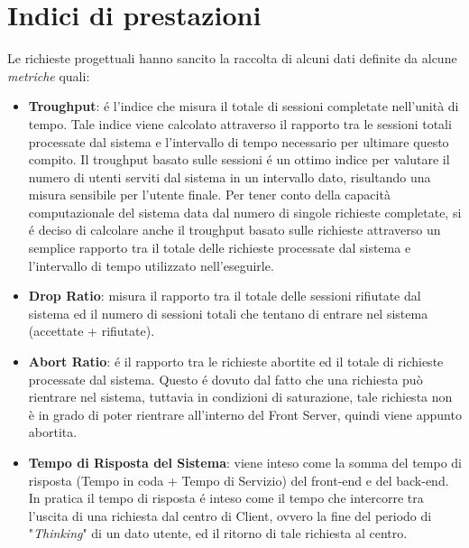 \section{Indici di prestazioni}
Le richieste progettuali hanno sancito la raccolta di alcuni dati definite da 
alcune \textit{metriche} quali:
\begin{itemize}
\item \textbf{Troughput}:
\'e l'indice  che misura il totale di sessioni completate nell'unit\`a di tempo. 
Tale indice viene calcolato attraverso il rapporto tra le sessioni totali 
processate dal sistema e l'intervallo di tempo necessario per ultimare questo 
compito. Il troughput basato sulle sessioni \'e un ottimo indice per valutare 
il numero di utenti serviti dal sistema in un intervallo dato, risultando una 
misura sensibile per l'utente finale. Per tener conto della capacit\`a 
computazionale del sistema data dal numero di singole richieste completate, si 
\'e deciso di calcolare anche il troughput basato sulle richieste attraverso un 
semplice rapporto tra il totale delle richieste processate dal sistema e 
l'intervallo di tempo utilizzato nell'eseguirle.

\item \textbf{Drop Ratio}:
misura il rapporto tra il totale delle sessioni rifiutate dal sistema ed il 
numero di sessioni totali che tentano di entrare nel sistema (accettate + 
rifiutate).

\item \textbf{Abort Ratio}:
\'e il rapporto tra le richieste abortite ed il totale di richieste processate 
dal sistema.
Questo \'e dovuto dal fatto che una richiesta pu\`o rientrare nel sistema, 
tuttavia in condizioni di saturazione, tale richiesta non \`e in grado di poter 
rientrare all'interno del Front Server, quindi viene appunto abortita.

\item \textbf{Tempo di Risposta del Sistema}:
viene inteso come la somma del tempo di risposta (Tempo in coda + Tempo di 
Servizio) del front-end e del back-end.
In pratica il tempo di risposta \'e inteso come il tempo che intercorre tra 
l'uscita di una richiesta dal centro di Client, ovvero la fine del periodo di 
"\textit{Thinking}" di un dato utente, ed il ritorno di tale richiesta al 
centro.
\end{itemize}
